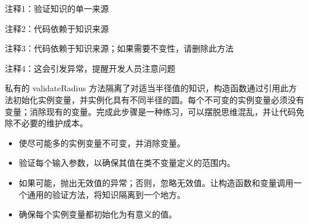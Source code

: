 {\footnotesize
注释1：验证知识的单一来源

注释2：代码依赖于知识来源

注释3：代码依赖于知识来源；如果需要不变性，请删除此方法

注释4：这会引发异常，提醒开发人员注意问题
}

私有的 validateRadius 方法隔离了对适当半径值的知识，构造函数通过引用此方法初始化实例变量，并实例化具有不同半径的圆。每个不可变的实例变量必须没有变量；消除现有的变量。完成此步骤是一种练习，可以摆脱思维混乱，并让代码免除不必要的维护成本。


\begin{itemize}
\item
使尽可能多的实例变量不可变，并消除变量。

\item
验证每个输入参数，以确保其值在类不变量定义的范围内。

\item
如果可能，抛出无效值的异常；否则，忽略无效值。让构造函数和变量调用一个通用的验证方法，将知识隔离到一个地方。

\item
确保每个实例变量都初始化为有意义的值。
\end{itemize}


















